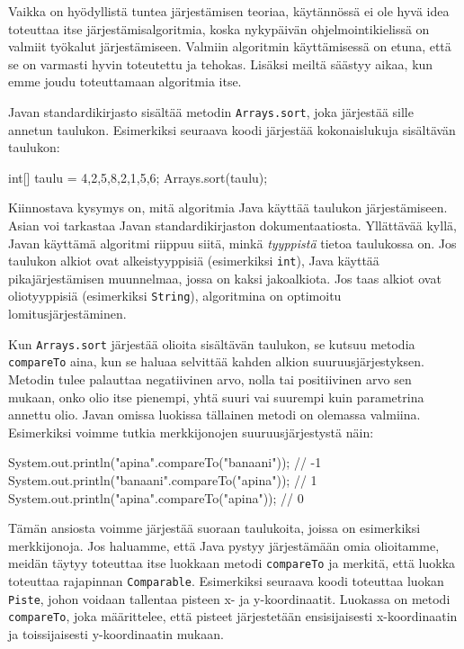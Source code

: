 Vaikka on hyödyllistä tuntea järjestämisen teoriaa,
käytännössä ei ole hyvä idea toteuttaa itse
järjestämisalgoritmia, koska nykypäivän ohjelmointikielissä
on valmiit työkalut järjestämiseen.
Valmiin algoritmin käyttämisessä on etuna,
että se on varmasti hyvin toteutettu ja tehokas.
Lisäksi meiltä säästyy aikaa, kun emme joudu
toteuttamaan algoritmia itse.

Javan standardikirjasto sisältää metodin \texttt{Arrays.sort},
joka järjestää sille annetun taulukon.
Esimerkiksi seuraava koodi järjestää kokonaislukuja
sisältävän taulukon:

\begin{code}
int[] taulu = {4,2,5,8,2,1,5,6};
Arrays.sort(taulu);
\end{code}

Kiinnostava kysymys on, mitä algoritmia Java käyttää
taulukon järjes\-tämiseen.
Asian voi tarkastaa Javan standardikirjaston
dokumentaatiosta.
Yllättävää kyllä, Javan käyttämä algoritmi riippuu siitä,
minkä \emph{tyyppistä} tietoa taulukossa on.
Jos taulukon alkiot ovat alkeistyyppisiä
(esimerkiksi \texttt{int}), Java käyttää 
pikajärjestämisen muunnelmaa,
jossa on kaksi jakoalkiota.
Jos taas alkiot ovat oliotyyppisiä
(esimerkiksi \texttt{String}),
algoritmina on optimoitu lomitusjärjestäminen.

Kun \texttt{Arrays.sort} järjestää olioita sisältävän taulukon,
se kutsuu metodia \texttt{compareTo} aina, kun se haluaa selvittää
kahden alkion suuruusjärjestyksen.
Metodin tulee palauttaa negatiivinen arvo, nolla tai positiivinen arvo
sen mukaan, onko olio itse pienempi, yhtä suuri vai suurempi
kuin parametrina annettu olio.
Javan omissa luokissa tällainen metodi on olemassa valmiina.
Esimerkiksi voimme tutkia merkkijonojen suuruusjärjestystä näin:

\begin{code}
System.out.println("apina".compareTo("banaani")); // -1
System.out.println("banaani".compareTo("apina")); // 1
System.out.println("apina".compareTo("apina")); // 0
\end{code}

Tämän ansiosta voimme järjestää suoraan taulukoita,
joissa on esimerkiksi merkkijonoja.
Jos haluamme, että Java pystyy järjestämään omia olioitamme,
meidän täytyy toteuttaa itse luokkaan metodi \texttt{compareTo} ja
merkitä, että luokka toteuttaa rajapinnan \texttt{Comparable}.
Esimerkiksi seuraava koodi toteuttaa luokan \texttt{Piste},
johon voidaan tallentaa pisteen x- ja y-koordinaatit.
Luokassa on metodi \texttt{compareTo}, joka määrittelee,
että pisteet järjestetään ensisijaisesti x-koordinaatin ja
toissijaisesti y-koordinaatin mukaan.

